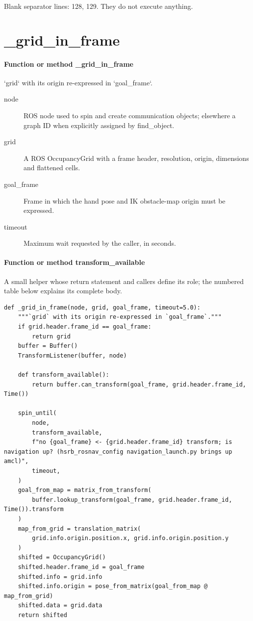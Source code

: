 \documentclass[11pt,a4paper]{book}
\begin{document}
Blank separator lines: 128, 129. They do not execute anything.

\section{\_grid\_in\_frame}

\paragraph{Function or method \_grid\_in\_frame}
`grid` with its origin re-expressed in `goal\_frame`.

\begin{description}
\item[node] ROS node used to spin and create communication objects; elsewhere a graph ID when explicitly assigned by find\_object.
\item[grid] A ROS OccupancyGrid with a frame header, resolution, origin, dimensions and flattened cells.
\item[goal\_frame] Frame in which the hand pose and IK obstacle-map origin must be expressed.
\item[timeout] Maximum wait requested by the caller, in seconds.
\end{description}

\paragraph{Function or method transform\_available}
A small helper whose return statement and callers define its role; the numbered table below explains its complete body.


\begin{lstlisting}[firstnumber=130]
def _grid_in_frame(node, grid, goal_frame, timeout=5.0):
    """`grid` with its origin re-expressed in `goal_frame`."""
    if grid.header.frame_id == goal_frame:
        return grid
    buffer = Buffer()
    TransformListener(buffer, node)

    def transform_available():
        return buffer.can_transform(goal_frame, grid.header.frame_id, Time())

    spin_until(
        node,
        transform_available,
        f"no {goal_frame} <- {grid.header.frame_id} transform; is navigation up? (hsrb_rosnav_config navigation_launch.py brings up amcl)",
        timeout,
    )
    goal_from_map = matrix_from_transform(
        buffer.lookup_transform(goal_frame, grid.header.frame_id, Time()).transform
    )
    map_from_grid = translation_matrix(
        grid.info.origin.position.x, grid.info.origin.position.y
    )
    shifted = OccupancyGrid()
    shifted.header.frame_id = goal_frame
    shifted.info = grid.info
    shifted.info.origin = pose_from_matrix(goal_from_map @ map_from_grid)
    shifted.data = grid.data
    return shifted


\end{lstlisting}
\end{document}
